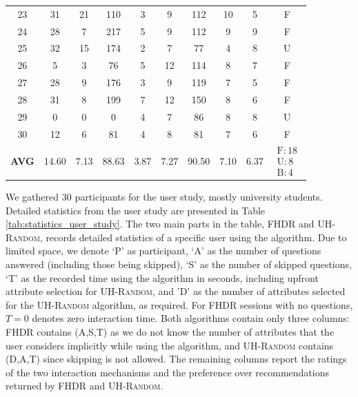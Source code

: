 \begin{table}[t]
{\begin{tabular}{c|ccc|ccc|cc|c}
23 & 31 & 21 & 110 & 3 & 9  & 112 & 10 & 5  & F \\
24 & 28 & 7  & 217 & 5 & 9  & 112 & 9  & 9  & F \\
25 & 32 & 15 & 174 & 2 & 7  & 77  & 4  & 8  & U \\
26 & 5  & 3  & 76  & 5 & 12 & 114 & 8  & 7  & F \\
27 & 28 & 9  & 176 & 3 & 9  & 119 & 7  & 5  & F \\
28 & 31 & 8  & 199 & 7 & 12 & 150 & 8  & 6  & F \\
29 & 0  & 0  & 0   & 4 & 7  & 86  & 8  & 8  & U \\
30 & 12 & 6  & 81  & 4 & 8  & 81  & 7  & 6  & F \\

\midrule
\textbf{AVG}
& 14.60
& 7.13
& 88.63
& 3.87
& 7.27
& 90.50
& 7.10
& 6.37
& $\substack{\mathrm{F}:18\\\mathrm{U}:8\\\mathrm{B}:4}$ \\

\bottomrule
\end{tabular}
}
\end{table}

We gathered $30$ participants for the user study, mostly university students. Detailed statistics from the user study are presented in Table \ref{tab:statistics_user_study}. The two main parts in the table, \textsc{FHDR} and \textsc{UH-Random}, records detailed statistics of a specific user using the algorithm. Due to limited space, we denote `P' as participant, `A' as the number of questions answered (including those being skipped), `S' as the number of skipped questions, `T' as the recorded time using the algorithm in seconds, including upfront attribute selection for \textsc{UH-Random}, and 'D' as the number of attributes selected for the \textsc{UH-Random} algorithm, as required. For FHDR sessions with no questions, $T=0$ denotes zero interaction time. Both algorithms contain only three columns: \textsc{FHDR} contains (A,S,T) as we do not know the number of attributes that the user considers implicitly while using the algorithm, and \textsc{UH-Random} contains (D,A,T) since skipping is not allowed. The remaining columns report the ratings of the two interaction mechanisms and the preference over recommendations returned by \textsc{FHDR} and \textsc{UH-Random}.

